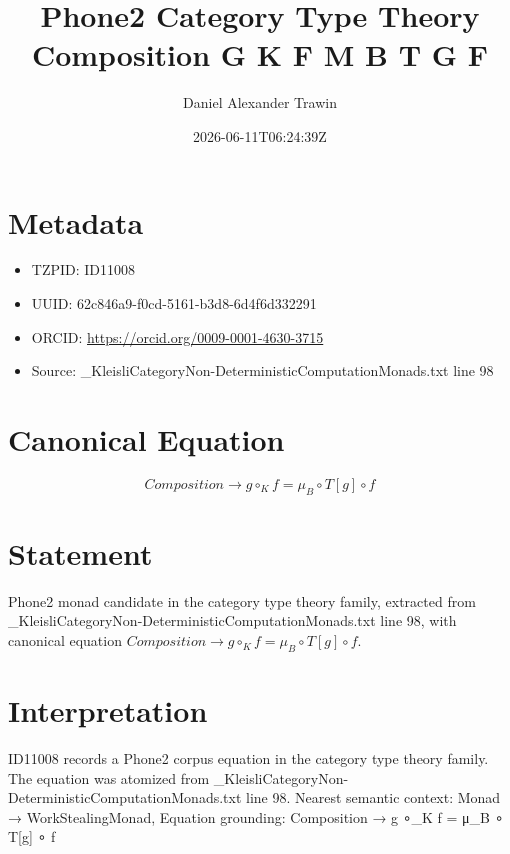 \documentclass[11pt]{article}
\title{Phone2 Category Type Theory Composition G K F Μ B T G F}
\author{Daniel Alexander Trawin}
\date{2026-06-11T06:24:39Z}
\begin{document}
\maketitle
\section*{Metadata}
\begin{itemize}
\item TZPID: ID11008
\item UUID: 62c846a9-f0cd-5161-b3d8-6d4f6d332291
\item ORCID: \url{https://orcid.org/0009-0001-4630-3715}
\item Source: _KleisliCategoryNon-DeterministicComputationMonads.txt line 98
\end{itemize}
\section*{Canonical Equation}
\[
Composition → g ∘_K f = μ_B ∘ T[g] ∘ f
\]
\section*{Statement}
Phone2 monad candidate in the category type theory family, extracted from _KleisliCategoryNon-DeterministicComputationMonads.txt line 98, with canonical equation $Composition → g ∘_K f = μ_B ∘ T[g] ∘ f$.
\section*{Interpretation}
ID11008 records a Phone2 corpus equation in the category type theory family. The equation was atomized from _KleisliCategoryNon-DeterministicComputationMonads.txt line 98. Nearest semantic context: Monad → WorkStealingMonad, Equation grounding: Composition → g ∘_K f = μ_B ∘ T[g] ∘ f
\end{document}
